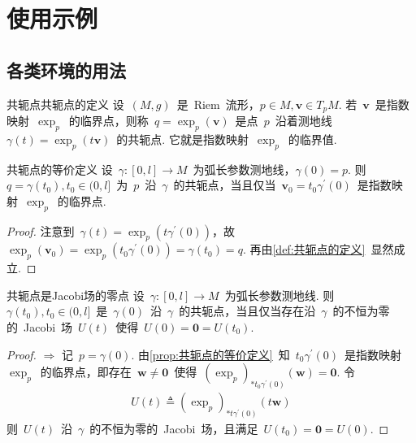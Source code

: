 \chapter{使用示例}\label{ch1}

\section{各类环境的用法}\label{ch1se1}

\begin{mydef}{共轭点}{共轭点的定义}
	设~$(M,g)$~是~Riem~流形，$p\in M,\boldsymbol{v}\in T_{p}M$. 若~$\boldsymbol{v}$~是指数映射~$\operatorname{exp}_{p}$~的临界点，则称~$q=\operatorname{exp}_{p}(\boldsymbol{v})$~是点~$p$~沿着测地线~$\gamma(t)=\operatorname{exp}_{p}(t \boldsymbol{v})$~的共轭点. 它就是指数映射~$\operatorname{exp}_{p}$~的临界值.
\end{mydef}

\begin{myprop}{}{共轭点的等价定义}
	设~$\gamma:[0,l]\longrightarrow M$~为弧长参数测地线，$\gamma(0)=p$. 则~$q=\gamma(t_{0}),t_{0}\in (0,l]$~为~$p$~沿~$\gamma$~的共轭点，当且仅当~$ \boldsymbol{v}_{0}=t_{0}\gamma^{\prime}(0)$~是指数映射~$\operatorname{exp}_{p}$~的临界点.
\end{myprop}

\begin{proof}
	注意到~$\gamma(t)=\operatorname{exp}_{p}(t \gamma^{\prime}(0))$，故~$\operatorname{exp}_{p}(\boldsymbol{v}_{0})=\operatorname{exp}_{p}(t_{0}\gamma^{\prime}(0))=\gamma(t_{0})=q$. 再由\ref{def:共轭点的定义}~显然成立. 
\end{proof}

\begin{mythm}{}{共轭点是Jacobi场的零点}
	设~$\gamma:[0,l]\longrightarrow M$~为弧长参数测地线. 则~$\gamma(t_{0}),t_{0}\in (0,l]$~是~$\gamma(0)$~沿~$\gamma$~的共轭点，当且仅当存在沿~$\gamma$~的不恒为零的~Jacobi~场~$U(t)$~使得~$U(0)=\boldsymbol{0}=U(t_{0})$.
\end{mythm}

\begin{proof}
   \emph{$\Longrightarrow$} 记~$p=\gamma(0)$. 由\ref{prop:共轭点的等价定义}~知~$t_{0}\gamma^{\prime}(0)$~是指数映射~$\operatorname{exp}_{p}$~的临界点，即存在~$ \boldsymbol{w}\neq \boldsymbol{0}$~使得~$\left( \operatorname{exp}_{p} \right)_{\ast t_{0}\gamma^{\prime}(0)}(\boldsymbol{w})=\boldsymbol{0}$. 令
	\begin{equation}
		\begin{aligned}
   			U(t)\triangleq \left( \operatorname{exp}_{p} \right)_{\ast t\gamma^{\prime}(0)}(t \boldsymbol{w})
		\end{aligned}
		\label{共轭点的Jacobi场的构造}
	\end{equation}
   则~$U(t)$~沿~$\gamma$~的不恒为零的~Jacobi~场，且满足~$U(t_{0})=\boldsymbol{0}=U(0)$.
\end{proof}

